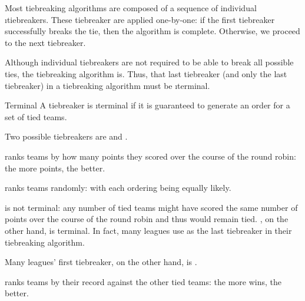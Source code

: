 {    Most tiebreaking algorithms are composed of a sequence of individual \i{tiebreakers}. These tiebreaker are applied one-by-one: if the first tiebreaker successfully breaks the tie, then the algorithm is complete. Otherwise, we proceed to the next tiebreaker.

    Although individual tiebreakers are not required to be able to break all possible ties, the tiebreaking algorithm is. Thus, that last tiebreaker (and only the last tiebreaker) in a tiebreaking algorithm must be \i{terminal}.

    \begin{definition}{Terminal}{}
        A tiebreaker is \i{terminal} if it is guaranteed to generate an order for a set of tied teams.
    \end{definition}

    Two possible tiebreakers are  and .

    \begin{definition}{}{}
         ranks teams by how many points they scored over the course of the round robin: the more points, the better.
    \end{definition}
    
    \begin{definition}{}{}
         ranks teams randomly: with each ordering being equally likely.
    \end{definition}

     is not terminal: any number of tied teams might have scored the same number of points over the course of the round robin and thus would remain tied. , on the other hand, is terminal. In fact, many leagues use  as the last tiebreaker in their tiebreaking algorithm.

    Many leagues' first tiebreaker, on the other hand, is .

    \begin{definition}{}{}
         ranks teams by their record against the other tied teams: the more wins, the better.
    \end{definition}

    }
